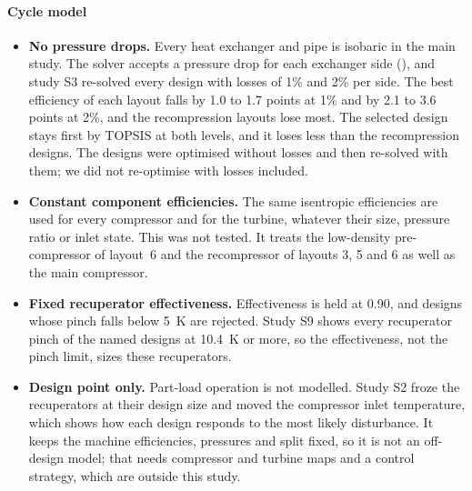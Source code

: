 \paragraph{Cycle model}
\begin{itemize}
  \item \textbf{No pressure drops.} Every heat exchanger and pipe is isobaric in the main study. The solver accepts a pressure drop for each exchanger side (), and study S3 re-solved every design with losses of 1\% and 2\% per side. The best efficiency of each layout falls by 1.0 to 1.7 points at 1\% and by 2.1 to 3.6 points at 2\%, and the recompression layouts lose most. The selected design stays first by TOPSIS at both levels, and it loses less than the recompression designs. The designs were optimised without losses and then re-solved with them; we did not re-optimise with losses included.
  \item \textbf{Constant component efficiencies.} The same isentropic efficiencies are used for every compressor and for the turbine, whatever their size, pressure ratio or inlet state. This was not tested. It treats the low-density pre-compressor of layout~6 and the recompressor of layouts 3, 5 and 6 as well as the main compressor.
  \item \textbf{Fixed recuperator effectiveness.} Effectiveness is held at 0.90, and designs whose pinch falls below \SI{5}{K} are rejected. Study S9 shows every recuperator pinch of the named designs at \SI{10.4}{K} or more, so the effectiveness, not the pinch limit, sizes these recuperators.
  \item \textbf{Design point only.} Part-load operation is not modelled. Study S2 froze the recuperators at their design size and moved the compressor inlet temperature, which shows how each design responds to the most likely disturbance. It keeps the machine efficiencies, pressures and split fixed, so it is not an off-design model; that needs compressor and turbine maps and a control strategy, which are outside this study.
\end{itemize}

